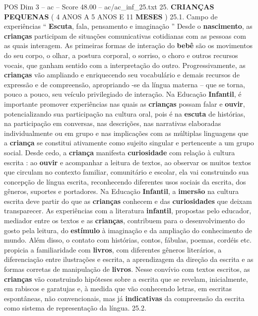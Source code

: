 \begin{textsample}{POS Dim 3 – ac – Score 48.00 – ac/ac\_inf\_25.txt}  \label{ex:f3_pos_028}
25. \textbf{CRIANÇAS} \textbf{PEQUENAS} ( 4 ANOS A 5 ANOS E 11 \textbf{MESES} ) 25.1.
Campo de experiências “ \textbf{Escuta}, fala, pensamento e imaginação ” Desde o \textbf{nascimento}, as \textbf{crianças} participam de situações comunicativas cotidianas com as pessoas com as quais interagem.
As primeiras formas de interação do \textbf{bebê} são os movimentos do seu corpo, o olhar, a postura corporal, o sorriso, o choro e outros recursos vocais, que ganham sentido com a interpretação do outro.
Progressivamente, as \textbf{crianças} vão ampliando e enriquecendo seu vocabulário e demais recursos de expressão e de compreensão, apropriando -se da língua materna – que se torna, pouco a pouco, seu veículo privilegiado de interação.
Na Educação \textbf{Infantil}, é importante promover experiências nas quais as \textbf{crianças} possam falar e \textbf{ouvir}, potencializando sua participação na cultura oral, pois é na \textbf{escuta} de histórias, na participação em conversas, nas descrições, nas narrativas elaboradas individualmente ou em grupo e nas implicações com as múltiplas linguagens que a \textbf{criança} se constitui ativamente como sujeito singular e pertencente a um grupo social.
Desde cedo, a \textbf{criança} manifesta \textbf{curiosidade} com relação à cultura escrita : ao \textbf{ouvir} e acompanhar a leitura de textos, ao observar os muitos textos que circulam no contexto familiar, comunitário e escolar, ela vai construindo sua concepção de língua escrita, reconhecendo diferentes usos sociais da escrita, dos gêneros, suportes e portadores.
Na Educação \textbf{Infantil}, a \textbf{imersão} na cultura escrita deve partir do que as \textbf{crianças} conhecem e das \textbf{curiosidades} que deixam transparecer.
As experiências com a literatura \textbf{infantil}, propostas pelo educador, mediador entre os textos e as \textbf{crianças}, contribuem para o desenvolvimento do gosto pela leitura, do \textbf{estímulo} à imaginação e da ampliação do conhecimento de mundo.
Além disso, o contato com histórias, contos, fábulas, poemas, cordéis etc. propicia a familiaridade com \textbf{livros}, com diferentes gêneros literários, a diferenciação entre ilustrações e escrita, a aprendizagem da direção da escrita e as formas corretas de manipulação de \textbf{livros}.
Nesse convívio com textos escritos, as \textbf{crianças} vão construindo hipóteses sobre a escrita que se revelam, inicialmente, em rabiscos e garatujas e, à medida que vão conhecendo letras, em escritas espontâneas, não convencionais, mas já \textbf{indicativas} da compreensão da escrita como sistema de representação da língua. 25.2.

\end{textsample}
